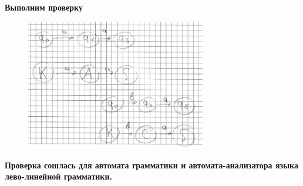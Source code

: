 \documentclass[a4paper, 14pt]{extarticle}
\begin{document}
\begin{center}
  \normalsize
  \bfseries
  Выполним проверку
\end{center}

\begin{figure}[h]
  \centering
  \includegraphics[width=0.7\textwidth,height=0.7\textheight,keepaspectratio]{six}
\end{figure}

\begin{center}
  \normalsize
  \bfseries
  Проверка сошлась для автомата грамматики и автомата-анализатора языка лево-линейной грамматики.
\end{center}
\end{document}
